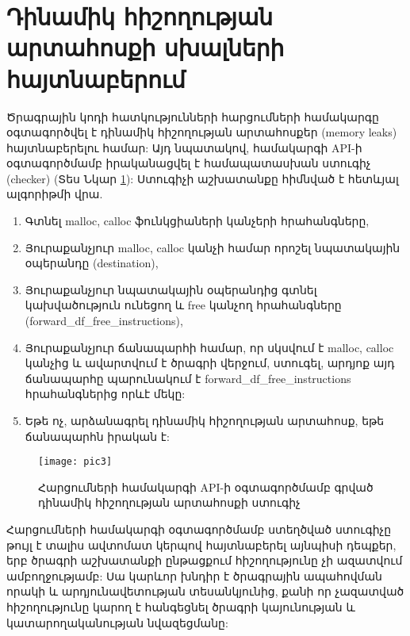 \clearpage
\section{Դինամիկ հիշողության արտահոսքի սխալների հայտնաբերում}\label{sec:bugDetection}
Ծրագրային կոդի հատկությունների հարցումների համակարգը օգտագործվել է դինամիկ հիշողության
արտահոսքեր (memory leaks)\cite{MEMORYLEAK} հայտնաբերելու համար: Այդ նպատակով, համակարգի API-ի օգտագործմամբ
իրականացվել է համապատասխան ստուգիչ (checker) (Տես Նկար \ref{fig:figure3}): Ստուգիչի աշխատանքը հիմնված է հետևյալ ալգորիթմի վրա.
\begin{enumerate}
    \item Գտնել malloc, calloc ֆունկցիաների կանչերի հրահանգները,
    \item Յուրաքանչյուր malloc, calloc կանչի համար որոշել նպատակային օպերանդը (destination),
    \item Յուրաքանչյուր նպատակային օպերանդից գտնել կախվածություն ունեցող և free կանչող հրահանգները (forward\_df\_free\_instructions),
    \item Յուրաքանչյուր ճանապարհի համար, որ սկսվում է malloc, calloc կանչից և ավարտվում է ծրագրի վերջում, ստուգել,
    արդյոք այդ ճանապարհը պարունակում է forward\_df\_free\_instructions հրահանգներից որևէ մեկը:
    \item Եթե ոչ, արձանագրել դինամիկ հիշողության արտահոսք, եթե ճանապարհն իրական է:
\end{enumerate}

\begin{figure}[h]
    \centering
    \texttt{[image: pic3]}
    \caption{Հարցումների համակարգի API-ի օգտագործմամբ գրված դինամիկ հիշողության արտահոսքի ստուգիչ}
    \label{fig:figure3}
\end{figure}

Հարցումների համակարգի օգտագործմամբ ստեղծված ստուգիչը թույլ է տալիս ավտոմատ կերպով հայտնաբերել
այնպիսի դեպքեր, երբ ծրագրի աշխատանքի ընթացքում հիշողությունը չի ազատվում ամբողջությամբ: Սա կարևոր խնդիր է ծրագրային
ապահովման որակի և արդյունավետության տեսանկյունից, քանի որ չազատված հիշողությունը կարող է հանգեցնել ծրագրի
կայունության և կատարողականության նվազեցմանը:


